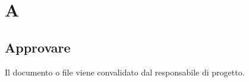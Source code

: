 \section{A}
\subsection{Approvare}%
Il documento o file viene convalidato dal responsabile di progetto.
\clearpage 
